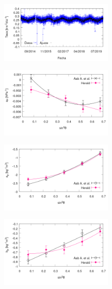 \begin{figure}[H]
	\centering
	\includegraphics[width=0.5\textwidth]{rate_Ajuste.png}
\end{figure}



\begin{figure}[H]
	\centering
	\includegraphics[width=0.5\textwidth]{ap.png}
\end{figure}

\begin{figure}[H]
	\centering
	\includegraphics[width=0.5\textwidth]{arho.png}
\end{figure}

\begin{figure}[H]
	\centering
	\includegraphics[width=0.5\textwidth]{brho.png}
\end{figure}




